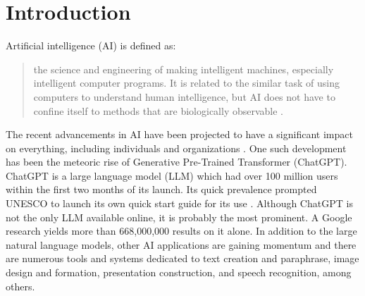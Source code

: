\documentclass[english]{textolivre}
\begin{document}
\begin{polyabstract}
\begin{portuguese}
\begin{abstract}
\end{abstract}
\end{portuguese}
\end{polyabstract}

\section{Introduction}\label{sec-intro}
Artificial intelligence (AI) is defined as:

\begin{quote}
the science and engineering of making intelligent machines, especially intelligent computer programs. It is related to the similar task of using computers to understand human intelligence, but AI does not have to confine itself to methods that are biologically observable \cite[p. 2]{mccarthy2007}.
\end{quote}

The recent advancements in AI have been projected to have a significant impact on everything, including individuals and organizations \cite{dwivedi2023}. One such development has been the meteoric rise of Generative Pre-Trained Transformer (ChatGPT). ChatGPT is a large language model (LLM) which had over 100 million users within the first two months of its launch. Its quick prevalence prompted UNESCO to launch its own quick start guide for its use \cite{unesco2023}. Although ChatGPT is not the only LLM available online, it is probably the most prominent. A Google research yields more than 668,000,000 results on it alone. In addition to the large natural language models, other AI applications are gaining momentum and there are numerous tools and systems dedicated to text creation and paraphrase, image design and formation, presentation construction, and speech recognition, among others.
\end{document}
